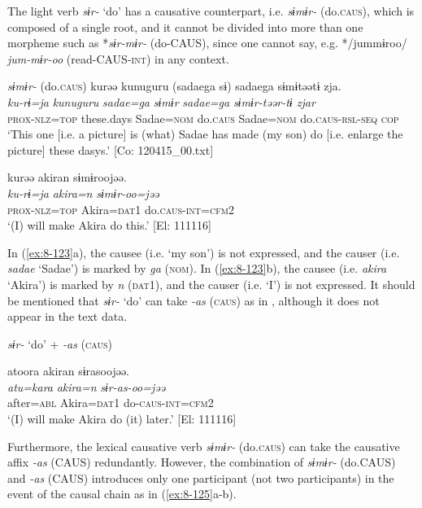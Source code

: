   The light verb \textit{sɨr-} ‘do’ has a causative counterpart, i.e. \textit{sɨmɨr-} (do.\textsc{caus}), which is composed of a single root, and it cannot be divided into more than one morpheme such as *\textit{sɨr-mɨr-} (do-CAUS), since one cannot say, e.g. */jummɨroo/ \textit{jum-mɨr-oo} (read-CAUS-\textsc{int}) in any context.

\ea\label{ex:8-123}
  \textit{sɨmɨr-} (do.\textsc{caus})
\ea
{\TM}
\glll  kurəə  kunuguru  (sadaega  sɨ)   sadaega  sɨmɨtəətɨ  zja.\\
\textit{ku-rɨ=ja}  \textit{kunuguru}  \textit{sadae=ga}  \textit{sɨmɨr}    \textit{sadae=ga}  \textit{sɨmɨr-təər-tɨ  zjar}\\
\textsc{prox}-\textsc{nlz}=\textsc{top}  these.days  Sadae=\textsc{nom}  do.\textsc{caus}  Sadae=\textsc{nom}  do.\textsc{caus}-\textsc{rsl}-\textsc{seq}  \textsc{cop}\\
\glt ‘This one [i.e. a picture] is (what) Sadae has made (my son) do [i.e. enlarge the picture] these dasys.’ [Co: 120415\_00.txt]

\ex
{\TM}
\glll  kurəə  akiran  sɨmɨroojəə.\\
\textit{ku-rɨ=ja}  \textit{akira=n}  \textit{sɨmɨr-oo=jəə}\\
\textsc{prox}-\textsc{nlz}=\textsc{top}  Akira=\textsc{dat1}  do.\textsc{caus}-\textsc{int}=\textsc{cfm2}\\
\glt ‘(I) will make Akira do this.’ [El: 111116]
\z
\z

In (\ref{ex:8-123}a), the causee (i.e. ‘my son’) is not expressed, and the causer (i.e. \textit{sadae} ‘Sadae’) is marked by \textit{ga} (\textsc{nom}). In (\ref{ex:8-123}b), the causee (i.e. \textit{akira} ‘Akira’) is marked by \textit{n} (\textsc{dat1}), and the causer (i.e. ‘I’) is not expressed. It should be mentioned that \textit{sɨr-} ‘do’ can take \textit{-as} (\textsc{caus}) as in , although it does not appear in the text data.

\ea\label{ex:8-124}
  \textit{sɨr-} ‘do’ + \textit{-as} (\textsc{caus})

  {\TM}
\glll  atoora  akiran  sɨrasoojəə.\\
\textit{atu=kara}  \textit{akira=n}  \textit{sɨr-as-oo=jəə}\\
    after=\textsc{abl}  Akira=\textsc{dat1}  do-\textsc{caus}-\textsc{int}=\textsc{cfm2}\\
\glt ‘(I) will make Akira do (it) later.’ [El: 111116]
\z

Furthermore, the lexical causative verb \textit{sɨmɨr-} (do.\textsc{caus}) can take the causative affix \textit{-as} (CAUS) redundantly. However, the combination of \textit{sɨmɨr-} (do.CAUS) and \textit{-as} (CAUS) introduces only one participant (not two participants) in the event of the causal chain as in (\ref{ex:8-125}a-b).

